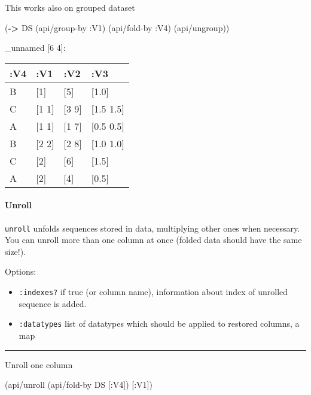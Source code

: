 \documentclass[]{article}
\newenvironment{Shaded}{\begin{snugshade}}{\end{snugshade}}
\newcommand{\KeywordTok}[1]{\textcolor[rgb]{0.13,0.29,0.53}{\textbf{#1}}}
\newcommand{\AttributeTok}[1]{\textcolor[rgb]{0.77,0.63,0.00}{#1}}
\newcommand{\NormalTok}[1]{#1}
\providecommand{\tightlist}{%
  \setlength{\itemsep}{0pt}\setlength{\parskip}{0pt}}
\let\oldparagraph\paragraph
\renewcommand{\paragraph}[1]{\oldparagraph{#1}\mbox{}}
\begin{document}
This works also on grouped dataset

\begin{Shaded}
\begin{Highlighting}[]
\NormalTok{(}\KeywordTok{->}\NormalTok{ DS}
\NormalTok{    (api/group-by }\AttributeTok{:V1}\NormalTok{)}
\NormalTok{    (api/fold-by }\AttributeTok{:V4}\NormalTok{)}
\NormalTok{    (api/ungroup))}
\end{Highlighting}
\end{Shaded}

\_unnamed {[}6 4{]}:

\begin{longtable}[]{@{}llll@{}}
\toprule
:V4 & :V1 & :V2 & :V3\tabularnewline
\midrule
\endhead
B & {[}1{]} & {[}5{]} & {[}1.0{]}\tabularnewline
C & {[}1 1{]} & {[}3 9{]} & {[}1.5 1.5{]}\tabularnewline
A & {[}1 1{]} & {[}1 7{]} & {[}0.5 0.5{]}\tabularnewline
B & {[}2 2{]} & {[}2 8{]} & {[}1.0 1.0{]}\tabularnewline
C & {[}2{]} & {[}6{]} & {[}1.5{]}\tabularnewline
A & {[}2{]} & {[}4{]} & {[}0.5{]}\tabularnewline
\bottomrule
\end{longtable}

\paragraph{Unroll}\label{unroll}

\texttt{unroll} unfolds sequences stored in data, multiplying other ones
when necessary. You can unroll more than one column at once (folded data
should have the same size!).

Options:

\begin{itemize}
\tightlist
\item
  \texttt{:indexes?} if true (or column name), information about index
  of unrolled sequence is added.
\item
  \texttt{:datatypes} list of datatypes which should be applied to
  restored columns, a map
\end{itemize}

\begin{center}\rule{0.5\linewidth}{0.5pt}\end{center}

Unroll one column

\begin{Shaded}
\begin{Highlighting}[]
\NormalTok{(api/unroll (api/fold-by DS [}\AttributeTok{:V4}\NormalTok{]) [}\AttributeTok{:V1}\NormalTok{])}
\end{Highlighting}
\end{Shaded}
\end{document}
